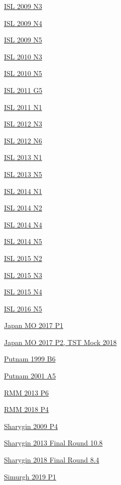 \hyperref  [problem:ISL 2009 N3]{ISL 2009 N3}

\hyperref  [problem:ISL 2009 N4]{ISL 2009 N4}

\hyperref  [problem:ISL 2009 N5]{ISL 2009 N5}

\hyperref  [problem:ISL 2010 N3]{ISL 2010 N3}

\hyperref  [problem:ISL 2010 N5]{ISL 2010 N5}

\hyperref  [problem:ISL 2011 G5]{ISL 2011 G5}

\hyperref  [problem:ISL 2011 N1]{ISL 2011 N1}

\hyperref  [problem:ISL 2012 N3]{ISL 2012 N3}

\hyperref  [problem:ISL 2012 N6]{ISL 2012 N6}

\hyperref  [problem:ISL 2013 N1]{ISL 2013 N1}

\hyperref  [problem:ISL 2013 N5]{ISL 2013 N5}

\hyperref  [problem:ISL 2014 N1]{ISL 2014 N1}

\hyperref  [problem:ISL 2014 N2]{ISL 2014 N2}

\hyperref  [problem:ISL 2014 N4]{ISL 2014 N4}

\hyperref  [problem:ISL 2014 N5]{ISL 2014 N5}

\hyperref  [problem:ISL 2015 N2]{ISL 2015 N2}

\hyperref  [problem:ISL 2015 N3]{ISL 2015 N3}

\hyperref  [problem:ISL 2015 N4]{ISL 2015 N4}

\hyperref  [problem:ISL 2016 N5]{ISL 2016 N5}

\hyperref  [problem:Japan MO 2017 P1]{Japan MO 2017 P1}

\hyperref  [problem:Japan MO 2017 P2, TST Mock 2018]{Japan MO 2017 P2, TST Mock 2018}

\hyperref  [problem:Putnam 1999 B6]{Putnam 1999 B6}

\hyperref  [problem:Putnam 2001 A5]{Putnam 2001 A5}

\hyperref  [problem:RMM 2013 P6]{RMM 2013 P6}

\hyperref  [problem:RMM 2018 P4]{RMM 2018 P4}

\hyperref  [problem:Sharygin 2009 P4]{Sharygin 2009 P4}

\hyperref  [problem:Sharygin 2013 Final Round 10.8]{Sharygin 2013 Final Round 10.8}

\hyperref  [problem:Sharygin 2018 Final Round 8.4]{Sharygin 2018 Final Round 8.4}

\hyperref  [problem:Simurgh 2019 P1]{Simurgh 2019 P1}

